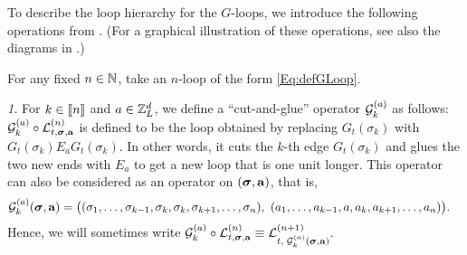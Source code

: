 
To describe the loop hierarchy for the $G$-loops, we introduce the following operations from \cite{YY_25}. (For a graphical illustration of these operations, see also the diagrams in \cite[Definition 2.10]{YY_25}.)


\begin{definition}\label{Def:oper_loop}
For any fixed $n\in \mathbb{N}$, take an $n$-loop of the form \eqref{Eq:defGLoop}.

\medskip
 
 \noindent 
 \emph{1.} For $k \in \llbracket{n}\rrbracket$ and $a\in {\mathbb Z}_L^d$, we define a ``cut-and-glue'' operator ${\mathcal{G}}^{(a)}_{k}$ as follows: ${\mathcal{G}}^{(a)}_{k} \circ {\mathcal L}^{(n)}_{t, {\boldsymbol{\sigma}}, \mathbf{a}}$ is defined to be the loop obtained by replacing $G_t(\sigma_k)$ with $G_{t}(\sigma_k) E_a G_{t}(\sigma_k)$. In other words, it cuts the $k$-th edge $G_t(\sigma_k)$ and glues the two new ends with $E_{a}$ to get a new loop that is one unit longer. This operator can also be considered as an operator on $({\boldsymbol{\sigma}},{\mathbf{a}})$, that is, 
\begin{align*}{\mathcal{G}}^{(a)}_{k} ({\boldsymbol{\sigma}}, {\mathbf{a}}) =  \big( & (\sigma_1,\ldots, \sigma_{k-1}, \sigma_k,\sigma_k ,\sigma_{k+1},\ldots, \sigma_n ),\  ( a_1 ,\ldots,  a_{k-1} ,  a , a_k , a_{k+1} ,\ldots,  a_n  )\big).\end{align*}
Hence, we will sometimes write ${\mathcal{G}}^{(a)}_{k} \circ {\mathcal L}^{(n)}_{t, {\boldsymbol{\sigma}}, {\mathbf{a}}}\equiv {\mathcal L}^{(n+1)}_{t, \;  {\mathcal{G}}^{(a)}_{k} ({\boldsymbol{\sigma}}, {\mathbf{a}})}.$ 

 


\end{definition}
